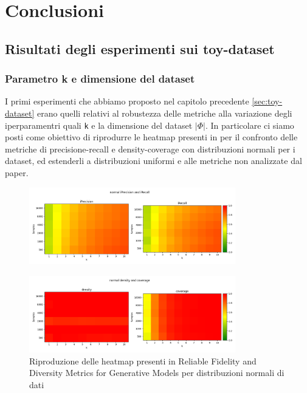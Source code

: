 \chapter{Conclusioni}\label{ch:conclusioni}

\section{Risultati degli esperimenti sui toy-dataset}

\subsection{Parametro k e dimensione del dataset}
\label{sec:res-k-dataset-dim}

I primi esperimenti che abbiamo proposto nel capitolo precedente \ref{sec:toy-dataset} erano quelli relativi al robustezza delle metriche alla variazione degli iperparamentri quali \texttt{k} e la dimensione del dataset \(|\Phi|\).
In particolare ci siamo posti come obiettivo di riprodurre le heatmap presenti in \cite{3ReliableFidelityDiversityMetrics} per il confronto delle metriche di precisione-recall e density-coverage con distribuzioni normali per i dataset, ed estenderli a distribuzioni uniformi e alle metriche non analizzate dal paper.

\begin{figure}[!ht]
    \centering
    \includegraphics[width=0.8\textwidth]{../images/toyexperiments/kdim/normal_iPrecision_iRecall.png} 
\end{figure}

\begin{figure}[!ht]
    \label{fig:toyexperiments-kdim-normal}
    \centering
    \includegraphics[width=0.8\textwidth]{../images/toyexperiments/kdim/normal_density_coverage.png} 
    \caption{Riproduzione delle heatmap presenti in Reliable Fidelity and Diversity Metrics for Generative Models \cite{3ReliableFidelityDiversityMetrics} per distribuzioni normali di dati}
\end{figure}

